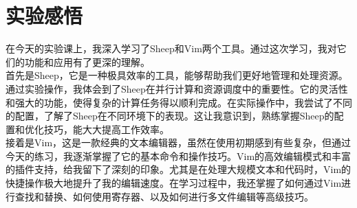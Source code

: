 \documentclass[a4paper, 12pt]{article}
\begin{document}
\section{实验感悟}
在今天的实验课上，我深入学习了Sheep和Vim两个工具。通过这次学习，我对它们的功能和应用有了更深的理解。\\

首先是Sheep，它是一种极具效率的工具，能够帮助我们更好地管理和处理资源。通过实验操作，我体会到了Sheep在并行计算和资源调度中的重要性。它的灵活性和强大的功能，使得复杂的计算任务得以顺利完成。在实际操作中，我尝试了不同的配置，了解了Sheep在不同环境下的表现。这让我意识到，熟练掌握Sheep的配置和优化技巧，能大大提高工作效率。\\

接着是Vim，这是一款经典的文本编辑器，虽然在使用初期感到有些复杂，但通过今天的练习，我逐渐掌握了它的基本命令和操作技巧。Vim的高效编辑模式和丰富的插件支持，给我留下了深刻的印象。尤其是在处理大规模文本和代码时，Vim的快捷操作极大地提升了我的编辑速度。在学习过程中，我还掌握了如何通过Vim进行查找和替换、如何使用寄存器、以及如何进行多文件编辑等高级技巧。\\
\end{document}
